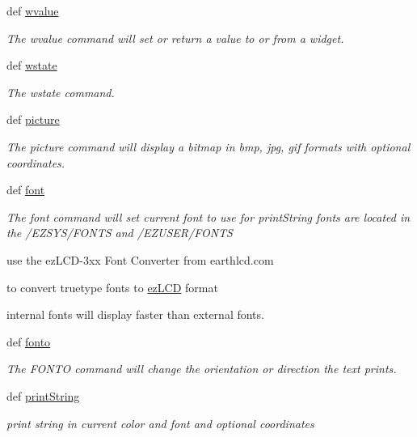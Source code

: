 \begin{DoxyCompactItemize}
def \hyperlink{group___widgets_ga7eaa2fac8abbadf04fa9afb49702906a}{wvalue}
\begin{DoxyCompactList}\small\item\em The wvalue command will set or return a value to or from a widget. \end{DoxyCompactList}\item 
def \hyperlink{group___widgets_gaada0b335d54904b4f4517755ace97e47}{wstate}
\begin{DoxyCompactList}\small\item\em The wstate command. \end{DoxyCompactList}\item 
def \hyperlink{group___bitmap_font_ga3bdde0a3f8505adbfb3c4b7107da7650}{picture}
\begin{DoxyCompactList}\small\item\em The picture command will display a bitmap in bmp, jpg, gif formats with optional coordinates. \end{DoxyCompactList}\item 
def \hyperlink{group___bitmap_font_ga7099c8ffc9b76ad3213d241bb8b8070f}{font}
\begin{DoxyCompactList}\small\item\em The font command will set current font to use for print\-String fonts are located in the /\-E\-Z\-S\-Y\-S/\-F\-O\-N\-T\-S and /\-E\-Z\-U\-S\-E\-R/\-F\-O\-N\-T\-S \par
 use the ez\-L\-C\-D-\/3xx Font Converter from earthlcd.\-com \par
 to convert truetype fonts to \hyperlink{classez_l_c_d3xx_1_1ez_l_c_d}{ez\-L\-C\-D} format \par
 internal fonts will display faster than external fonts. \end{DoxyCompactList}\item 
def \hyperlink{group___bitmap_font_ga445e7a916dbdae456f88bea5fcd88745}{fonto}
\begin{DoxyCompactList}\small\item\em The F\-O\-N\-T\-O command will change the orientation or direction the text prints. \end{DoxyCompactList}\item 
def \hyperlink{group___bitmap_font_gac3a90d479a0423de66988b9850f4852c}{print\-String}
\begin{DoxyCompactList}\small\item\em print string in current color and font and optional coordinates \end{DoxyCompactList}\end{DoxyCompactItemize}
